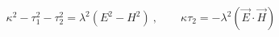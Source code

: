 \begin{equation}\label{lorinv}
\kappa ^2-\tau _1^2-\tau _2^2  = \lambda^2(E^2-H^2)~,\qquad
\kappa \tau _2  =  -\lambda ^2(\vec{E}\cdot \vec{H})
\end{equation}

